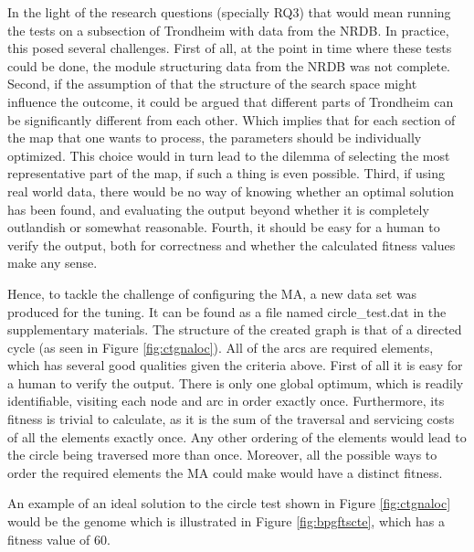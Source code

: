 In the light of the research questions (specially RQ3) that would mean running the tests on a subsection of Trondheim with data from the NRDB. In practice, this posed several challenges. First of all, at the point in time where these tests could be done, the module structuring data from the NRDB was not complete. Second, if the assumption of that the structure of the search space might influence the outcome, it could be argued that different parts of Trondheim can be significantly different from each other. Which implies that for each section of the map that one wants to process, the parameters should be individually optimized. This choice would in turn lead to the dilemma of selecting the most representative part of the map, if such a thing is even possible. Third, if using real world data, there would be no way of knowing whether an optimal solution has been found, and evaluating the output beyond whether it is completely outlandish or somewhat reasonable. Fourth, it should be easy for a human to verify the output, both for correctness and whether the calculated fitness values make any sense.

Hence, to tackle the challenge of configuring the MA, a new data set was produced for the tuning. It can be found as a file named circle\_test.dat in the supplementary materials. The structure of the created graph is that of a directed cycle (as seen in Figure \ref{fig:ctgnaloc}). All of the arcs are required elements, which has several good qualities given the criteria above. First of all it is easy for a human to verify the output. There is only one global optimum, which is readily identifiable, visiting each node and arc in order exactly once. Furthermore, its fitness is trivial to calculate, as it is the sum of the traversal and servicing costs of all the elements exactly once. Any other ordering of the elements would lead to the circle being traversed more than once. Moreover, all the possible ways to order the required elements the MA could make would have a distinct fitness.

An example of an ideal solution to the circle test shown in Figure \ref{fig:ctgnaloc} would be the genome which is illustrated in Figure \ref{fig:bpgftscte}, which has a fitness value of 60.

